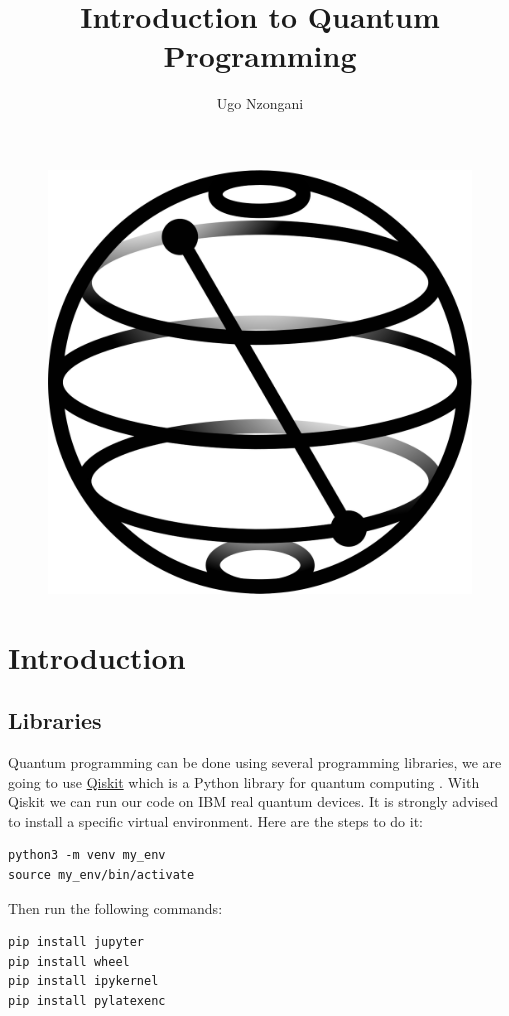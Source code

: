 \documentclass{article}
\title{Introduction to Quantum Programming}
\author{Ugo Nzongani}
\date{\vskip 0.5cm}
\begin{document}

\maketitle

\tableofcontents

\vskip 1cm

\begin{figure}[H]
    \centering
    \includegraphics[scale=0.13]{qiskit.png}
\end{figure}

\newpage

\section{Introduction}

\subsection{Libraries}

Quantum programming can be done using several programming libraries, we are going to use \href{https://qiskit.org/}{Qiskit} which is a Python library for quantum computing \cite{qiskit2024}. With Qiskit we can run our code on IBM real quantum devices. It is strongly advised to install a specific virtual environment. Here are the steps to do it:
\begin{verbatim}
python3 -m venv my_env
source my_env/bin/activate
\end{verbatim}
Then run the following commands:
\begin{verbatim}
pip install jupyter
pip install wheel
pip install ipykernel
pip install pylatexenc
\end{verbatim}
\end{document}
